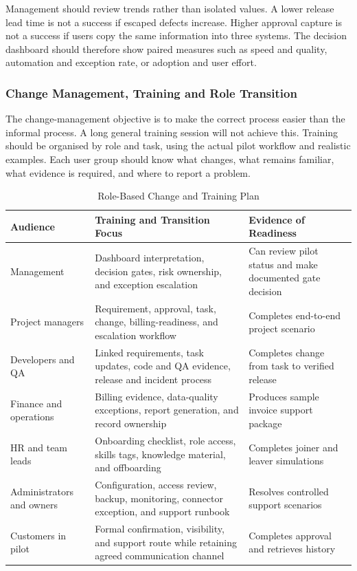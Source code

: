 \documentclass[12pt,a4paper]{report}
\begin{document}
Management should review trends rather than isolated values. A lower release lead time is not a
success if escaped defects increase. Higher approval capture is not a success if users copy the same
information into three systems. The decision dashboard should therefore show paired measures such
as speed and quality, automation and exception rate, or adoption and user effort.

\subsubsection{Change Management, Training and Role Transition}
\label{sec:change-management}

The change-management objective is to make the correct process easier than the informal process.
A long general training session will not achieve this. Training should be organised by role and task,
using the actual pilot workflow and realistic examples. Each user group should know what changes,
what remains familiar, what evidence is required, and where to report a problem.

\begin{table}[H]
\centering
\caption{Role-Based Change and Training Plan}
\label{tab:change-training}
\small
\renewcommand{\arraystretch}{1.17}
\begin{tabularx}{\textwidth}{>{\raggedright\arraybackslash}p{2.7cm}
                                >{\raggedright\arraybackslash}X
                                >{\raggedright\arraybackslash}p{3.4cm}}
\toprule
\textbf{Audience} & \textbf{Training and Transition Focus} & \textbf{Evidence of Readiness} \\
\midrule
Management & Dashboard interpretation, decision gates, risk ownership, and exception escalation & Can review pilot status and make documented gate decision \\
Project managers & Requirement, approval, task, change, billing-readiness, and escalation workflow & Completes end-to-end project scenario \\
Developers and QA & Linked requirements, task updates, code and QA evidence, release and incident process & Completes change from task to verified release \\
Finance and operations & Billing evidence, data-quality exceptions, report generation, and record ownership & Produces sample invoice support package \\
HR and team leads & Onboarding checklist, role access, skills tags, knowledge material, and offboarding & Completes joiner and leaver simulations \\
Administrators and owners & Configuration, access review, backup, monitoring, connector exception, and support runbook & Resolves controlled support scenarios \\
Customers in pilot & Formal confirmation, visibility, and support route while retaining agreed communication channel & Completes approval and retrieves history \\
\bottomrule
\end{tabularx}
\end{table}
\end{document}
